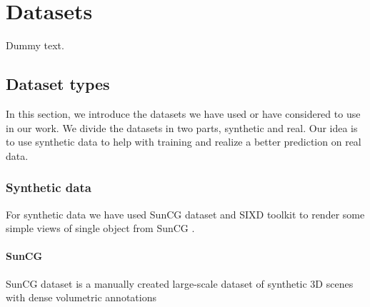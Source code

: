 \chapter{Datasets}

Dummy text.

\section{Dataset types}

In this section, we introduce the datasets we have used or have considered to use in our work. We divide the datasets in two parts, synthetic and real. Our idea is to use synthetic data to help with training and realize a better prediction on real data.

\subsection{Synthetic data}

For synthetic data we have used SunCG dataset and SIXD toolkit to render some simple views of single object from SunCG .

\subsubsection{SunCG}
SunCG dataset is a manually created large-scale dataset of synthetic 3D scenes with dense volumetric annotations \cite{song2016ssc}

